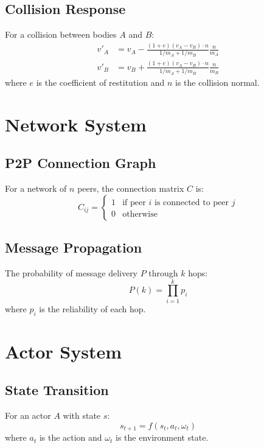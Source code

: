 \documentclass{article}
\begin{document}
\subsection{Collision Response}
For a collision between bodies $A$ and $B$:
\begin{equation}
\begin{aligned}
v'_A &= v_A - \frac{(1+e)(v_A - v_B) \cdot n}{1/m_A + 1/m_B} \frac{n}{m_A} \\
v'_B &= v_B + \frac{(1+e)(v_A - v_B) \cdot n}{1/m_A + 1/m_B} \frac{n}{m_B}
\end{aligned}
\end{equation}
where $e$ is the coefficient of restitution and $n$ is the collision normal.

\section{Network System}

\subsection{P2P Connection Graph}
For a network of $n$ peers, the connection matrix $C$ is:
\begin{equation}
C_{ij} = \begin{cases}
1 & \text{if peer } i \text{ is connected to peer } j \\
0 & \text{otherwise}
\end{cases}
\end{equation}

\subsection{Message Propagation}
The probability of message delivery $P$ through $k$ hops:
\begin{equation}
P(k) = \prod_{i=1}^{k} p_i
\end{equation}
where $p_i$ is the reliability of each hop.

\section{Actor System}

\subsection{State Transition}
For an actor $A$ with state $s$:
\begin{equation}
s_{t+1} = f(s_t, a_t, \omega_t)
\end{equation}
where $a_t$ is the action and $\omega_t$ is the environment state.
\end{document}
